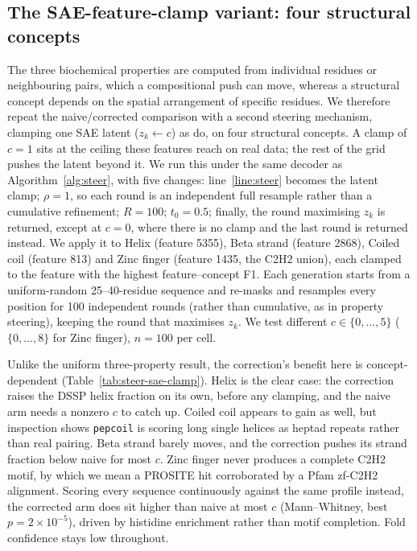 \documentclass{article}
\begin{document}
\subsection{The SAE-feature-clamp variant: four structural concepts}
\label{app:steer-sae-clamp}

The three biochemical properties are computed from individual residues or neighbouring pairs, which a compositional push can
move, whereas a structural concept depends on the spatial arrangement of specific residues. We therefore repeat the naive/corrected comparison with a
second steering mechanism, clamping one SAE latent ($z_k\!\leftarrow\!c$) as
\cite{villegas2025plmsae} do, on four structural concepts. A clamp of $c{=}1$ sits at the ceiling these features reach on real data; the rest of the grid pushes the latent beyond it. We run this under the same decoder as Algorithm~\ref{alg:steer}, with five changes:
line~\ref{line:steer} becomes the latent clamp; $\rho{=}1$, so each round is an independent
full resample rather than a cumulative refinement; $R{=}100$; $t_0{=}0.5$; finally, the round
maximising $z_k$ is returned, except at $c{=}0$, where there is no clamp and the last round is returned instead. We apply it to Helix (feature 5355),
Beta strand (feature 2868), Coiled coil (feature 813) and Zinc finger (feature 1435, the C2H2 union), each clamped to
the feature with the highest feature--concept F1. Each generation starts from a uniform-random
25--40-residue sequence and re-masks and resamples every position for 100 independent rounds (rather than cumulative, as in property steering), keeping the
round that maximises $z_k$. We test different $c\in\{0,\dots,5\}$ ($\{0,\dots,8\}$ for Zinc finger),
$n{=}100$ per cell.

Unlike the uniform three-property result, the correction's benefit here is concept-dependent
(Table~\ref{tab:steer-sae-clamp}). Helix is the clear case: the correction raises the DSSP helix
fraction on its own, before any clamping, and the naive arm needs a nonzero $c$ to catch
up. Coiled coil appears to gain as well, but inspection shows \texttt{pepcoil} is scoring long
single helices as heptad repeats rather than real pairing. Beta strand barely moves, and the
correction pushes its strand fraction below naive for most $c$. Zinc finger never produces
a complete C2H2 motif, by which we mean a PROSITE hit corroborated by a Pfam zf-C2H2 alignment.
Scoring every sequence continuously against the same profile instead, the corrected arm does
sit higher than naive at most $c$ (Mann--Whitney, best $p{=}2\times10^{-5}$), driven by histidine enrichment rather than motif completion. Fold confidence stays
low throughout.
\end{document}
